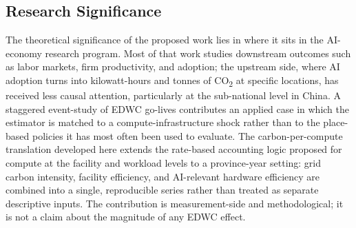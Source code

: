 \documentclass[12pt,a4paper]{article}
\begin{document}
\subsection{Research Significance}
%
%
%

The theoretical significance of the proposed work lies in where it
sits in the AI-economy research program. Most of that work studies
downstream outcomes such as labor markets, firm productivity, and
adoption; the upstream side, where AI adoption turns into
kilowatt-hours and tonnes of CO\textsubscript{2} at specific locations,
has received less causal attention, particularly at the sub-national
level in China. A staggered event-study of EDWC go-lives contributes
an applied case in which the estimator
\citep{sunabraham-2021-estimatingdynamictreatmenta} is matched to a
compute-infrastructure shock rather than to the place-based policies
it has most often been used to evaluate. The carbon-per-compute
translation developed here extends the rate-based accounting logic
proposed for compute at the facility and workload levels
\citep{guptaetal-2022-chasingcarbonelusive} to a province-year
setting: grid carbon intensity, facility efficiency, and AI-relevant
hardware efficiency are combined into a single, reproducible series
rather than treated as separate descriptive inputs. The contribution
is measurement-side and methodological; it is not a claim about the
magnitude of any EDWC effect.
\end{document}

